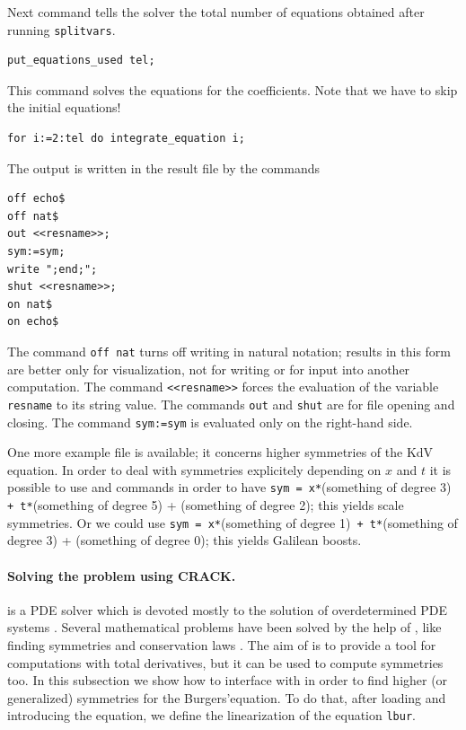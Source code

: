 Next command tells the solver the total number of equations obtained
after running \texttt{splitvars}.
\hypertarget{operator:PUT_EQUATIONS_USED}{}
\begin{verbatim}
put_equations_used tel;
\end{verbatim}
This command solves the equations for the coefficients.
Note that we have to skip the initial equations!
\hypertarget{operator:INTEGRATE_EQUATION}{}
\begin{verbatim}
for i:=2:tel do integrate_equation i;
\end{verbatim}

The output is written in the result file by the commands
\begin{verbatim}
off echo$
off nat$
out <<resname>>;
sym:=sym;
write ";end;";
shut <<resname>>;
on nat$
on echo$
\end{verbatim}
The command \texttt{off nat} turns off writing in natural notation; results in
this form are better only for visualization, not for writing or for input into
another computation. The command \texttt{<<resname>>} forces the evaluation of
the variable \texttt{resname} to its string value. The commands \texttt{out}
and \texttt{shut} are for file opening and closing. The command
\texttt{sym:=sym} is evaluated only on the right-hand side.

One more example file is available; it concerns higher symmetries of the KdV
equation. In order to deal with symmetries explicitely depending on $x$ and
$t$ it is possible to use \REDUCE and \cde commands in order to have
\texttt{sym = x*}(something of degree 3)\texttt{ + t*}(something of degree  5)
+ (something of degree 2); this yields scale symmetries.
Or we could use \texttt{sym = x*}(something of degree 1)\texttt{ +
  t*}(something of degree 3) + (something of degree 0);
this yields Galilean boosts.

\paragraph*{Solving the problem using CRACK.}
\crack is a PDE solver which is devoted mostly to the solution of
overdetermined PDE systems \cite{Brand:95,WolfBrand:CRACK}. Several mathematical problems
have been solved by the help of \crack, like finding symmetries
\cite{Wolf:APPLYSYM,Brand:92} and conservation laws \cite{Wolf:99d}. The aim of \cde is
to provide a tool for computations with total derivatives, but it can be used
to compute symmetries too. In this subsection we show how to interface \cde
with \crack in order to find higher (or generalized) symmetries for the
Burgers'equation. To do that, after loading \cde and introducing the equation,
we define the linearization of the equation \texttt{lbur}.


